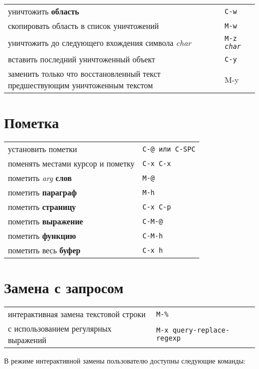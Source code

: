 \documentclass[10pt]{article}
\newlength{\ColWidth}
\newcommand{\kbd}[1]{\texttt{#1}}
\begin{document}
\begin{tabular}{p{\ColWidth}l}
уничтожить {\bf область} & \kbd{C-w} \\
скопировать область в список уничтожений & \kbd{M-w} \\
уничтожить до следующего вхождения символа {\it char} & \kbd{M-z {\it char}} \\

вставить последний уничтоженный объект & \kbd{C-y} \\
заменить только что восстановленный текст предшествующим уничтоженным текстом & M-y \\
\end{tabular}

\section{Пометка}

\begin{tabular}{p{\ColWidth}l}
установить пометки & \kbd{C-@ {\rm или} C-SPC} \\
поменять местами курсор и пометку & \kbd{C-x C-x} \\

пометить {\it arg\/} {\bf слов} & \kbd{M-@} \\
пометить {\bf параграф} & \kbd{M-h} \\
пометить {\bf страницу} & \kbd{C-x C-p} \\
пометить {\bf выражение} & \kbd{C-M-@} \\
пометить {\bf функцию} & \kbd{C-M-h} \\
пометить весь {\bf буфер} & \kbd{C-x h} \\
\end{tabular}

\section{Замена с запросом}

\begin{tabular}{p{\ColWidth}l}
интерактивная замена текстовой строки & \kbd{M-\%} \\
с использованием регулярных выражений & \kbd{M-x query-replace-regexp} \\
\end{tabular}

В режиме интерактивной замены пользователю доступны следующие команды:
\end{document}
